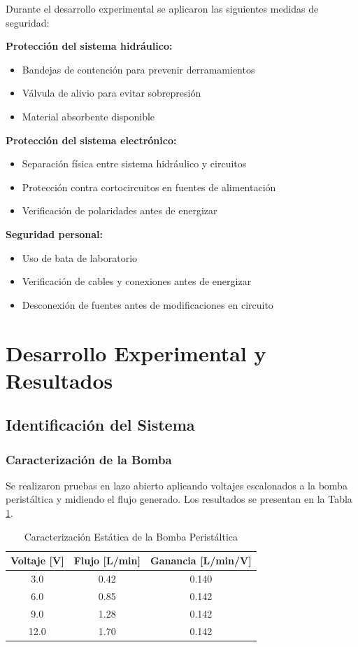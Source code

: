 \documentclass[conference]{IEEEtran}
\begin{document}
Durante el desarrollo experimental se aplicaron las siguientes medidas de seguridad:

\textbf{Protección del sistema hidráulico:}
\begin{itemize}
\item Bandejas de contención para prevenir derramamientos
\item Válvula de alivio para evitar sobrepresión
\item Material absorbente disponible
\end{itemize}

\textbf{Protección del sistema electrónico:}
\begin{itemize}
\item Separación física entre sistema hidráulico y circuitos
\item Protección contra cortocircuitos en fuentes de alimentación
\item Verificación de polaridades antes de energizar
\end{itemize}

\textbf{Seguridad personal:}
\begin{itemize}
\item Uso de bata de laboratorio
\item Verificación de cables y conexiones antes de energizar
\item Desconexión de fuentes antes de modificaciones en circuito
\end{itemize}

\section{Desarrollo Experimental y Resultados}

\subsection{Identificación del Sistema}

\subsubsection{Caracterización de la Bomba}

Se realizaron pruebas en lazo abierto aplicando voltajes escalonados a la bomba peristáltica y midiendo el flujo generado. Los resultados se presentan en la Tabla \ref{tab:caract_bomba}.

\begin{table}[htbp]
\centering
\caption{Caracterización Estática de la Bomba Peristáltica}
\label{tab:caract_bomba}
\begin{tabular}{ccc}
\toprule
\textbf{Voltaje [V]} & \textbf{Flujo [L/min]} & \textbf{Ganancia [L/min/V]} \\
\midrule
3.0 & 0.42 & 0.140 \\
6.0 & 0.85 & 0.142 \\
9.0 & 1.28 & 0.142 \\
12.0 & 1.70 & 0.142 \\
\bottomrule
\end{tabular}
\end{table}
\end{document}
